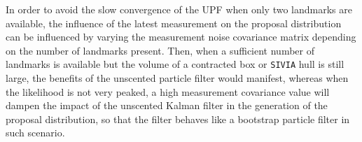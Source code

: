 In order to avoid the slow convergence of the UPF when only two landmarks are available, the influence of the latest measurement on the proposal distribution can be influenced by varying the measurement noise covariance matrix depending on the number of landmarks present. Then, when a sufficient number of landmarks is available but the volume of a contracted box or \texttt{SIVIA} hull is still large, the benefits of the unscented particle filter would manifest, whereas when the likelihood is not very peaked, a high measurement covariance value will dampen the impact of the unscented Kalman filter in the generation of the proposal distribution, so that the filter behaves like a bootstrap particle filter in such scenario.










